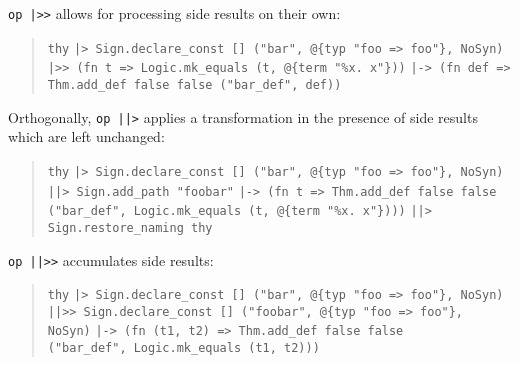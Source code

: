 \begin{isabellebody}
\begin{isamarkuptext}
\begin{quotation}
  \end{quotation}

  \noindent \verb|op |\verb,|,\verb|>>| allows for processing side results on their own:
  \begin{quotation}
\verb|thy|\isasep\isanewline%
\verb||\verb,|,\verb|> Sign.declare_const [] ("bar", @{typ "foo => foo"}, NoSyn)|\isasep\isanewline%
\verb||\verb,|,\verb|>> (fn t => Logic.mk_equals (t, @{term "%x. x"}))|\isasep\isanewline%
\verb||\verb,|,\verb|-> (fn def => Thm.add_def false false ("bar_def", def))|\isasep\isanewline%

  \end{quotation}

  \noindent Orthogonally, \verb|op |\verb,|,\verb||\verb,|,\verb|>| applies a transformation
  in the presence of side results which are left unchanged:
  \begin{quotation}
\verb|thy|\isasep\isanewline%
\verb||\verb,|,\verb|> Sign.declare_const [] ("bar", @{typ "foo => foo"}, NoSyn)|\isasep\isanewline%
\verb||\verb,|,\verb||\verb,|,\verb|> Sign.add_path "foobar"|\isasep\isanewline%
\verb||\verb,|,\verb|-> (fn t => Thm.add_def false false|\isasep\isanewline%
\verb|      ("bar_def", Logic.mk_equals (t, @{term "%x. x"})))|\isasep\isanewline%
\verb||\verb,|,\verb||\verb,|,\verb|> Sign.restore_naming thy|\isasep\isanewline%

  \end{quotation}

  \noindent {}\verb|op |\verb,|,\verb||\verb,|,\verb|>>| accumulates side results:
  \begin{quotation}
\verb|thy|\isasep\isanewline%
\verb||\verb,|,\verb|> Sign.declare_const [] ("bar", @{typ "foo => foo"}, NoSyn)|\isasep\isanewline%
\verb||\verb,|,\verb||\verb,|,\verb|>> Sign.declare_const [] ("foobar", @{typ "foo => foo"}, NoSyn)|\isasep\isanewline%
\verb||\verb,|,\verb|-> (fn (t1, t2) => Thm.add_def false false|\isasep\isanewline%
\verb|      ("bar_def", Logic.mk_equals (t1, t2)))|\isasep\isanewline%


\end{quotation}
\end{isamarkuptext}
\end{isabellebody}
